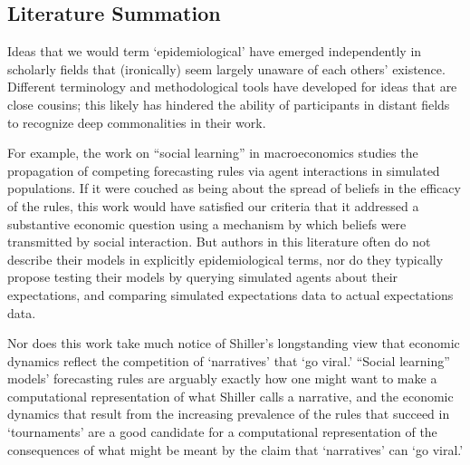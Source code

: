 

\hypertarget{subsec:literature}{}

\subsection{Literature Summation}\label{subsec:literature}


Ideas that we would term `epidemiological' have emerged independently in scholarly fields that (ironically) seem largely unaware of each others' existence.  Different terminology and methodological tools have developed for ideas that are close cousins; this likely has hindered the ability of participants in distant fields to recognize deep commonalities in their work.

For example, the work on ``social learning'' in macroeconomics studies the propagation of competing forecasting rules via agent interactions in simulated populations.  If it were couched as being about the spread of beliefs in the efficacy of the rules, this work would have satisfied our criteria that it addressed a substantive economic question using a mechanism by which beliefs were transmitted by social interaction.  But authors in this literature often do not describe their models in explicitly epidemiological terms, nor do they typically propose testing their models by querying simulated agents about their expectations, and comparing simulated expectations data to actual expectations data.

Nor does this work take much notice of Shiller's longstanding view that economic dynamics reflect the competition of `narratives' that `go viral.'  ``Social learning'' models'  forecasting rules are arguably exactly how one might want to make a computational representation of what Shiller calls a narrative, and the economic dynamics that result from the increasing prevalence of the rules that succeed in `tournaments' are a good candidate for a computational representation of the consequences of what might be meant by the claim that `narratives' can `go viral.'

